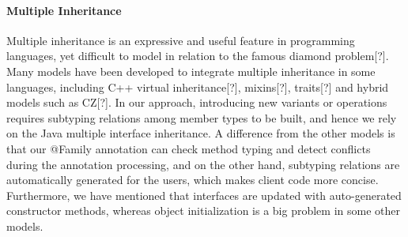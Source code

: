 \paragraph{Multiple Inheritance}

Multiple inheritance is an expressive and useful feature in programming languages, yet difficult to model in relation to the famous diamond problem[?].
Many models have been developed to integrate multiple inheritance in some languages, including C++ virtual inheritance[?], mixins[?], traits[?] and
hybrid models such as CZ[?]. In our approach, introducing new variants or operations requires subtyping relations among member types to be built, and
hence we rely on the Java multiple interface inheritance. A difference from the other models is that our \textsf{@Family} annotation can check method
typing and detect conflicts during the annotation processing, and on the other hand, subtyping relations are automatically generated for the users, which
makes client code more concise. Furthermore, we have mentioned that interfaces are updated with auto-generated constructor methods, whereas object initialization is a big problem in some other models.
